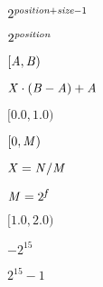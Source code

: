 {\newpage
\clearpage
\samepage \( 2^{\hbox{\scriptsize\it position}+\hbox{\scriptsize\it size}-1} \)
}

{\newpage
\clearpage
\samepage \( 2^{\hbox{\scriptsize\it position}} \)
}

{\newpage
\clearpage
\samepage $[{\it A},{\it B})$
}

{\newpage
\clearpage
\samepage ${\it X}\cdot({\it B}-{\it A})+{\it A}$
}

{\newpage
\clearpage
\samepage $[0.0, 1.0)$
}

{\newpage
\clearpage
\samepage $[0,{\it M})$
}

{\newpage
\clearpage
\samepage ${\it X}={\it N}/{\it M}$
}

{\newpage
\clearpage
\samepage ${\it M}=2^{\hbox{\footnotesize\it f}}$
}

{\newpage
\clearpage
\samepage $[1.0, 2.0)$
}

{\newpage
\clearpage
\samepage $-2^{15}$
}

{\newpage
\clearpage
\samepage $2^{15}-1$
}

